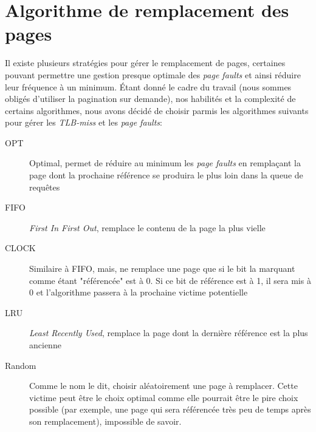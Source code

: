 \documentclass{article}
\begin{document}
\section{Algorithme de remplacement des pages}
\setlength{\parindent}{20pt}
Il existe plusieurs stratégies pour gérer le remplacement de pages, certaines pouvant permettre une gestion presque optimale des 
\emph{page faults} et ainsi réduire leur fréquence à un minimum. Étant donné le cadre du travail (nous sommes obligés d'utiliser la pagination 
sur demande), nos habilités et la complexité de certains algorithmes, nous avons décidé de choisir parmis les algorithmes suivants pour gérer les 
\emph{TLB-miss} et les \emph{page faults}:\\
\begin{description}
    \item [OPT] Optimal, permet de réduire au minimum les \emph{page faults} en remplaçant la page dont la prochaine référence se produira le 
    plus loin dans la queue de requêtes
    \item [FIFO] \emph{First In First Out}, remplace le contenu de la page la plus vielle
    \item [CLOCK] Similaire à FIFO, mais, ne remplace une page que si le bit la marquant comme étant "référencée" est à 0. Si ce bit de référence 
    est à 1, il sera mis à 0 et l'algorithme passera à la prochaine victime potentielle
    \item [LRU] \emph{Least Recently Used}, remplace la page dont la dernière référence est la plus ancienne
    \item [Random] Comme le nom le dit, choisir aléatoirement une page à remplacer. Cette victime peut être le choix optimal comme elle pourrait 
    être le pire choix possible (par exemple, une page qui sera référencée très peu de temps après son remplacement), impossible de savoir.
\end{description}
\end{document}

